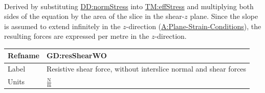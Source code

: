\documentclass[12pt]{article}
\begin{document}
\paragraph{}
\label{GD:effNormFDeriv}
Derived by substituting \hyperref[DD:normStress]{DD:normStress} into \hyperref[TM:effStress]{TM:effStress} and multiplying both sides of the equation by the area of the slice in the shear-$z$ plane. Since the slope is assumed to extend infinitely in the $z$-direction (\hyperref[assumpPSC]{A:Plane-Strain-Conditions}), the resulting forces are expressed per metre in the $z$-direction.

\medskip
\noindent
\begin{minipage}{\textwidth}
\begin{tabular}{>{\raggedright}p{}>{\raggedright\arraybackslash}p{}}
\toprule \textbf{Refname} & \textbf{GD:resShearWO}
\label{GD:resShearWO}
\\ \midrule
Label & Resistive shear force, without interslice normal and shear forces
        
\\ \midrule
Units & $\frac{\text{N}}{\text{m}}$
        

\end{tabular}
\end{minipage}
\end{document}
